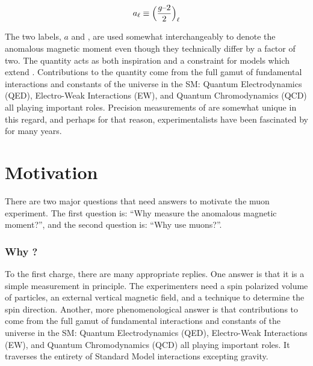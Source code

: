 \begin{equation}
\label{eqn:a-lepton}
a_{\ell} \equiv \Big(\frac{g\hbox{--}2}{2} \Big)_\ell
\end{equation}

\noindent
The two labels, $a$ and \gmtwo, are used somewhat interchangeably to denote the anomalous magnetic moment even though they technically differ by a factor of two.  The quantity acts as both inspiration and a constraint for models which extend \tsm.  Contributions to the quantity come from the full gamut of fundamental interactions and constants of the universe in the SM: Quantum Electrodynamics (QED), Electro-Weak Interactions (EW), and Quantum Chromodynamics (QCD) all playing important roles.  Precision measurements of \gmtwo are somewhat unique in this regard, and perhaps for that reason, experimentalists have been fascinated by \gmtwo for many years.

\section{Motivation}

There are two major questions that need answers to motivate the muon \gmtwo experiment.  The first question is: ``Why measure the anomalous magnetic moment?'', and the second question is: ``Why use muons?''.

\subsubsection{Why \gmtwo?}
To the first charge, there are many appropriate replies.  One answer is that it is a simple measurement in principle.  The experimenters need a spin polarized volume of particles, an external vertical magnetic field, and a technique to determine the spin direction. Another, more phenomenological answer is that contributions to \gmtwo come from the full gamut of fundamental interactions and constants of the universe in the SM: Quantum Electrodynamics (QED), Electro-Weak Interactions (EW), and Quantum Chromodynamics (QCD) all playing important roles. It traverses the entirety of Standard Model interactions excepting gravity.

